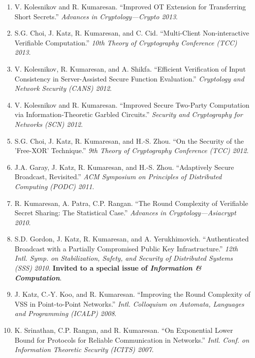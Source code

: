\documentclass[11pt]{article}
\begin{document}
\begin{enumerate}[leftmargin=*, itemsep=1pt]
    \item V. Kolesnikov and R. Kumaresan. ``Improved OT Extension for Transferring Short Secrets.'' \textit{Advances in Cryptology—Crypto 2013}.
    
    \item S.G. Choi, J. Katz, R. Kumaresan, and C. Cid. ``Multi-Client Non-interactive Verifiable Computation.'' \textit{10th Theory of Cryptography Conference (TCC) 2013}.
    
    \item V. Kolesnikov, R. Kumaresan, and A. Shikfa. ``Efficient Verification of Input Consistency in Server-Assisted Secure Function Evaluation.'' \textit{Cryptology and Network Security (CANS) 2012}.
    
    \item V. Kolesnikov and R. Kumaresan. ``Improved Secure Two-Party Computation via Information-Theoretic Garbled Circuits.'' \textit{Security and Cryptography for Networks (SCN) 2012}.
    
    \item S.G. Choi, J. Katz, R. Kumaresan, and H.-S. Zhou. ``On the Security of the 'Free-XOR' Technique.'' \textit{9th Theory of Cryptography Conference (TCC) 2012}.
    
    \item J.A. Garay, J. Katz, R. Kumaresan, and H.-S. Zhou. ``Adaptively Secure Broadcast, Revisited.'' \textit{ACM Symposium on Principles of Distributed Computing (PODC) 2011}.
    
    \item R. Kumaresan, A. Patra, C.P. Rangan. ``The Round Complexity of Verifiable Secret Sharing: The Statistical Case.'' \textit{Advances in Cryptology—Asiacrypt 2010}.
    
    \item S.D. Gordon, J. Katz, R. Kumaresan, and A. Yerukhimovich. ``Authenticated Broadcast with a Partially Compromised Public Key Infrastructure.'' \textit{12th Intl. Symp. on Stabilization, Safety, and Security of Distributed Systems (SSS) 2010}. \textbf{Invited to a special issue of \textit{Information \& Computation}}.
    
    \item J. Katz, C.-Y. Koo, and R. Kumaresan. ``Improving the Round Complexity of VSS in Point-to-Point Networks.'' \textit{Intl. Colloquium on Automata, Languages and Programming (ICALP) 2008}.
    
    \item K. Srinathan, C.P. Rangan, and R. Kumaresan. ``On Exponential Lower Bound for Protocols for Reliable Communication in Networks.'' \textit{Intl. Conf. on Information Theoretic Security (ICITS) 2007}.
\end{enumerate}
\end{document}
